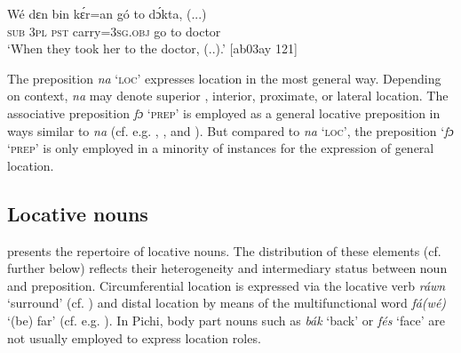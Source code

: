 \ea%
    \label{ex:key:909}
    \gll Wé  dɛn  bin  kɛ́r=an    gó  to  dɔ́kta,  (...)\\
\textsc{sub}  \textsc{3pl}  \textsc{pst}  carry=\textsc{3sg.obj}  go  to  doctor\\

\glt ‘When they took her to the doctor, (..).’ [ab03ay 121]
\z

The preposition \textit{na} ‘\textsc{loc}’ expresses location in the most general way. Depending on context, \textit{na} may denote superior , interior, proximate, or lateral  location. The associative preposition \textit{fɔ} ‘\textsc{prep}’ is employed as a general locative preposition in ways similar to \textit{na} (cf. e.g. , ,  and ). But compared to \textit{na} ‘\textsc{loc}’, the preposition ‘\textit{fɔ} ‘\textsc{prep}’ is only employed in a minority of instances for the expression of general location.

\subsection{Locative nouns}\label{sec:8.1.2}
 presents the repertoire of locative nouns. The distribution of these elements (cf.  further below) reflects their heterogeneity and intermediary status between noun and preposition. Circumferential location is expressed via the locative verb \textit{ráwn} ‘surround’ (cf. ) and distal location by means of the multifunctional word \textit{fá(wé)} ‘(be) far’ (cf. e.g. ). In Pichi, body part\index{} nouns such as \textit{bák} ‘back’ or \textit{fés} ‘face’ are not usually employed to express location roles.

